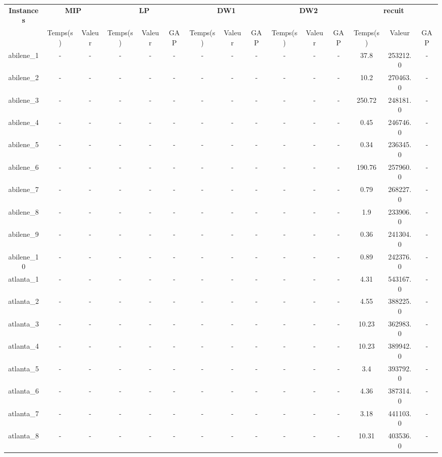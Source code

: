 \documentclass[main.tex]{subfiles}
\begin{document}
\thispagestyle{empty}

\begin{landscape}
\begin{table}[h]
    \centering
    \begin{tabular}{c|cc|ccc|ccc|ccc|ccc}
	\hline	
	\textbf{Instances} &\multicolumn{2}{c}{\textbf{MIP}} &\multicolumn{3}{c}{\textbf{LP}} &\multicolumn{3}{c}{\textbf{DW1}} &\multicolumn{3}{c}{\textbf{DW2}} &\multicolumn{3}{c}{\textbf{recuit}}\\
	 &Temps(s) &Valeur &Temps(s) &Valeur &GAP &Temps(s) &Valeur &GAP &Temps(s) &Valeur &GAP &Temps(s) &Valeur &GAP\\

	\hline
	abilene\_1 &- &- &- &- &- &- &- &- &- &- &- &37.8 &253212.0 &-\\
	abilene\_2 &- &- &- &- &- &- &- &- &- &- &- &10.2 &270463.0 &-\\
	abilene\_3 &- &- &- &- &- &- &- &- &- &- &- &250.72 &248181.0 &-\\
	abilene\_4 &- &- &- &- &- &- &- &- &- &- &- &0.45 &246746.0 &-\\
	abilene\_5 &- &- &- &- &- &- &- &- &- &- &- &0.34 &236345.0 &-\\
	abilene\_6 &- &- &- &- &- &- &- &- &- &- &- &190.76 &257960.0 &-\\
	abilene\_7 &- &- &- &- &- &- &- &- &- &- &- &0.79 &268227.0 &-\\
	abilene\_8 &- &- &- &- &- &- &- &- &- &- &- &1.9 &233906.0 &-\\
	abilene\_9 &- &- &- &- &- &- &- &- &- &- &- &0.36 &241304.0 &-\\
	abilene\_10 &- &- &- &- &- &- &- &- &- &- &- &0.89 &242376.0 &-\\
	atlanta\_1 &- &- &- &- &- &- &- &- &- &- &- &4.31 &543167.0 &-\\
	atlanta\_2 &- &- &- &- &- &- &- &- &- &- &- &4.55 &388225.0 &-\\
	atlanta\_3 &- &- &- &- &- &- &- &- &- &- &- &10.23 &362983.0 &-\\
	atlanta\_4 &- &- &- &- &- &- &- &- &- &- &- &10.23 &389942.0 &-\\
	atlanta\_5 &- &- &- &- &- &- &- &- &- &- &- &3.4 &393792.0 &-\\
	atlanta\_6 &- &- &- &- &- &- &- &- &- &- &- &4.36 &387314.0 &-\\
	atlanta\_7 &- &- &- &- &- &- &- &- &- &- &- &3.18 &441103.0 &-\\
	atlanta\_8 &- &- &- &- &- &- &- &- &- &- &- &10.31 &403536.0 &-\\

\end{tabular}
\end{table}
\end{landscape}
\end{document}
